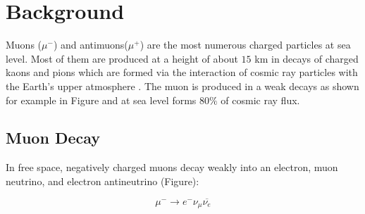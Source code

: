 
\section{Background}

Muons ($\mu^-$) and antimuons($\mu^+$) are the most numerous charged
particles at sea level\cite{pdg}. Most of them are produced at a
height of about $15$ km in decays of charged kaons and pions which are
formed via the interaction of cosmic ray particles with the Earth's
upper atmosphere \cite{amsler}. The muon is produced in a weak decays
as shown for example in Figure and at sea level forms $80\%$ of cosmic
ray flux.


\begin{center}
\end{center}


\subsection{Muon Decay}

In free space, negatively charged muons decay weakly into an electron,
muon neutrino, and electron antineutrino \cite{easwar} (Figure):

\begin{equation}\mu^- \rightarrow e^- \nu_{\mu}\overline{\nu_e}\label{mudecay}\end{equation}

